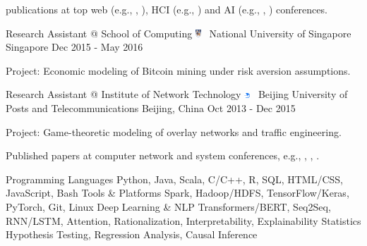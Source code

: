 \documentclass[letterpaper]{awesome-cv}
\begin{document}
\begin{cventries}
{\begin{cvitems}
        \item { publications at top web (e.g., , ), HCI (e.g., ) and AI (e.g., , ) conferences.}
      \end{cvitems}
    }
  \cventry
    {Research Assistant @ School of Computing}
    {\includegraphics[width=0.016\textwidth]{../images/logos/nus.png}~ National University of Singapore}
    {Singapore}
    {Dec 2015 - May 2016}
    {
      \begin{cvitems}
        \item {Project: Economic modeling of Bitcoin mining under risk aversion assumptions.}
      \end{cvitems}
    }
  \cventry
    {Research Assistant @ Institute of Network Technology}
    {\includegraphics[width=0.016\textwidth]{../images/logos/bupt.png}~ Beijing University of Posts and Telecommunications}
    {Beijing, China}
    {Oct 2013 - Dec 2015}
    {
      \begin{cvitems}
        \item {Project: Game-theoretic modeling of overlay networks and traffic engineering.}
        \item {Published papers at computer network and system conferences, e.g., , , .}
      \end{cvitems}
    }
\end{cventries}

\addvspace{0.2ex}
\begin{cventries}
 \cvskillnew
    {Programming Languages}
    {Python, Java, Scala, C/C++, R, SQL, HTML/CSS, JavaScript, Bash}
  \cvskillnew
    {Tools \& Platforms}
    {Spark, Hadoop/HDFS, TensorFlow/Keras, PyTorch, Git, Linux}
  \cvskillnew
    {Deep Learning \& NLP}
    {Transformers/BERT, Seq2Seq, RNN/LSTM, Attention, Rationalization, Interpretability, Explainability}
  \cvskillnew
    {Statistics}
    {Hypothesis Testing, Regression Analysis, Causal Inference}
\end{cventries}
\end{document}
